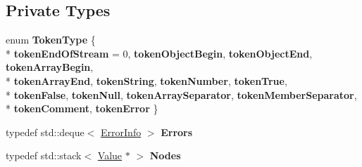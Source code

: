 \subsection*{Private Types}
\begin{DoxyCompactItemize}
\item 
enum {\bfseries Token\-Type} \{ \\*
{\bfseries token\-End\-Of\-Stream} = 0, 
{\bfseries token\-Object\-Begin}, 
{\bfseries token\-Object\-End}, 
{\bfseries token\-Array\-Begin}, 
\\*
{\bfseries token\-Array\-End}, 
{\bfseries token\-String}, 
{\bfseries token\-Number}, 
{\bfseries token\-True}, 
\\*
{\bfseries token\-False}, 
{\bfseries token\-Null}, 
{\bfseries token\-Array\-Separator}, 
{\bfseries token\-Member\-Separator}, 
\\*
{\bfseries token\-Comment}, 
{\bfseries token\-Error}
 \}
\item 
\hypertarget{class_json_1_1_reader_aae51e8f5bab3f067261c842a3ef858e5}{typedef std\-::deque$<$ \hyperlink{class_json_1_1_reader_1_1_error_info}{Error\-Info} $>$ {\bfseries Errors}}\label{class_json_1_1_reader_aae51e8f5bab3f067261c842a3ef858e5}

\item 
\hypertarget{class_json_1_1_reader_ad98d0ea4f3576ea83947c1b2b7b2f261}{typedef std\-::stack$<$ \hyperlink{class_json_1_1_value}{Value} $\ast$ $>$ {\bfseries Nodes}}\label{class_json_1_1_reader_ad98d0ea4f3576ea83947c1b2b7b2f261}

\end{DoxyCompactItemize}
